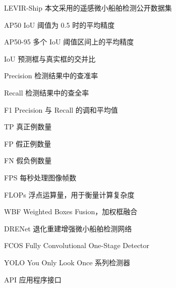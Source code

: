 
\begin{notation}

  \begin{notationlist}{2.8em}
    \item[LEVIR-Ship] 本文采用的遥感微小船舶检测公开数据集
    \item[AP50] IoU 阈值为 0.5 时的平均精度
    \item[AP50-95] 多个 IoU 阈值区间上的平均精度
    \item[IoU] 预测框与真实框的交并比
    \item[Precision] 检测结果中的查准率
    \item[Recall] 检测结果中的查全率
    \item[F1] Precision 与 Recall 的调和平均值
    \item[TP] 真正例数量
    \item[FP] 假正例数量
    \item[FN] 假负例数量
    \item[FPS] 每秒处理图像帧数
    \item[FLOPs] 浮点运算量，用于衡量计算复杂度
    \item[WBF] Weighted Boxes Fusion，加权框融合
    \item[DRENet] 退化重建增强微小船舶检测网络
    \item[FCOS] Fully Convolutional One-Stage Detector
    \item[YOLO] You Only Look Once 系列检测器
    \item[API] 应用程序接口
  \end{notationlist}

\end{notation}
